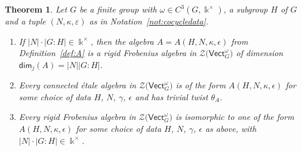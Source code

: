 \documentclass[pdftex]{sigma}
\numberwithin{equation}{section}
\newtheorem{Theorem}{Theorem}[section]
\renewcommand{\dim}{\mathsf{dim}}
\newcommand{\Vect}{\mathsf{Vect}}
\newcommand{\cZ}{\mathcal{Z}}
\begin{document}
\begin{Theorem} \label{thm:classification} Let $G$ be a finite group with $\omega\in C^3(G,\Bbbk^\times)$, a subgroup $H$ of $G$ and a tuple $(N,\kappa,\varepsilon)$ as in Notation~{\rm \ref{not:cocycledata}}.
\begin{enumerate}\itemsep=0pt
 \item[$(a)$] If $|N|\cdot|G:H| \in \Bbbk^{\times}$, then the algebra $A=A(H,N,\kappa, \epsilon)$ from Definition~{\rm \ref{def:A}} is a rigid Frobenius algebra in $\cZ\big(\Vect_G^\omega\big)$ of dimension $\dim_j(A)=|N| |G:H|$.
 \item[$(b)$] Every connected \'etale algebra in $\cZ\big(\Vect_G^\omega\big)$ is of the form $A(H,N,\kappa, \epsilon)$ for some choice of data $H$, $N$, $\gamma$, $\epsilon$ and has trivial twist $\theta_A$.
 \item[$(c)$] Every rigid Frobenius algebra in $\cZ\big(\Vect_G^\omega\big)$ is isomorphic to one of the form $A(H,N,\kappa, \epsilon)$ for some choice of data $H$, $N$, $\gamma$, $\epsilon$ as above, with $|N| \cdot |G:H| \in \Bbbk^{\times}$.
\end{enumerate}
\end{Theorem}
\end{document}
